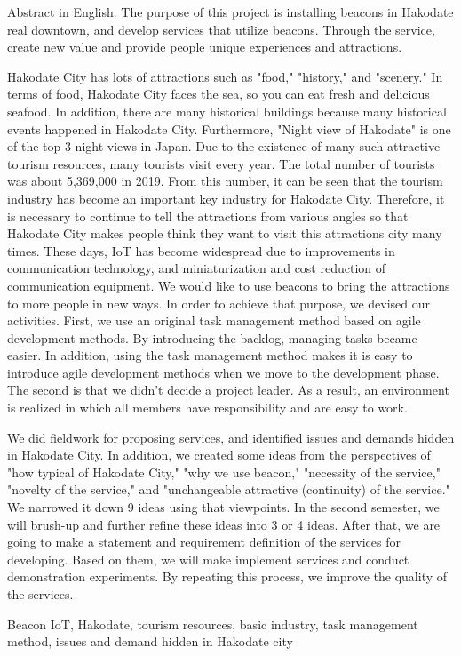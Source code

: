 \begin{eabstract} Abstract in English. 
The purpose of this project is installing beacons in Hakodate real downtown, and develop services that utilize beacons. Through the service, create new value and provide people unique experiences and attractions.

Hakodate City has lots of attractions such as "food," "history," and "scenery."
In terms of food, Hakodate City faces the sea, so you can eat fresh and delicious seafood.
In addition, there are many historical buildings because many historical events happened in Hakodate City.
Furthermore, "Night view of Hakodate" is one of the top 3 night views in Japan.
Due to the existence of many such attractive tourism resources, many tourists visit every year.
The total number of tourists was about 5,369,000 in 2019.
From this number, it can be seen that the tourism industry has become an important key industry for Hakodate City.
Therefore, it is necessary to continue to tell the attractions from various angles so that Hakodate City makes people think they want to visit this attractions city many times.
These days, IoT has become widespread due to improvements in communication technology, and miniaturization and cost reduction of communication equipment.
We would like to use beacons to bring the attractions to more people in new ways.
In order to achieve that purpose, we devised our activities.
First, we use an original task management method based on agile development methods.
By introducing the backlog, managing tasks became easier.
In addition, using the task management method makes it is easy to introduce agile development methods when we move to the development phase.
The second is that we didn't decide a project leader.
As a result, an environment is realized in which all members have responsibility and are easy to work.

We did fieldwork for proposing services, and identified issues and demands hidden in Hakodate City.
In addition, we created some ideas from the perspectives of "how typical of Hakodate City," "why we use beacon," "necessity of the service," "novelty of the service," and "unchangeable attractive (continuity) of the service."
We narrowed it down 9 ideas using that viewpoints.
In the second semester, we will brush-up and further refine these ideas into 3 or 4 ideas.
After that, we are going to make a statement and requirement definition of the services for developing.
Based on them, we will make implement services and conduct demonstration experiments.
By repeating this process, we improve the quality of the services. 
\begin{ekeyword}
Beacon IoT, Hakodate, tourism resources, basic industry, task management method, issues and demand hidden in Hakodate city
\end{ekeyword}
\end{eabstract}

